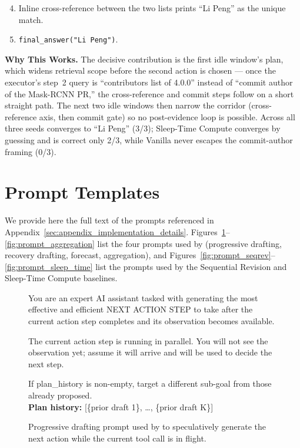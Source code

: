 \begin{tcolorbox}[colback=blue!4, colframe=blue!60!black, title={\textsc{\methodname{}} (Pred: Li Peng / GT: Li Peng; 5 steps)}, fontupper=\small, breakable]
\begin{quote}
\end{quote}
\begin{enumerate}
\setcounter{enumi}{3}
  \item Inline cross-reference between the two lists prints ``Li Peng'' as the unique match.
  \item \texttt{final\_answer("Li Peng")}.
\end{enumerate}
\textbf{Why This Works.} The decisive contribution is the first idle window's plan, which widens retrieval scope before the second action is chosen --- once the executor's step~2 query is ``contributors list of 4.0.0'' instead of ``commit author of the Mask-RCNN PR,'' the cross-reference and commit steps follow on a short straight path. The next two idle windows then narrow the corridor (cross-reference axis, then commit gate) so no post-evidence loop is possible. Across all three seeds \methodname{} converges to ``Li Peng'' (3/3); Sleep-Time Compute converges by guessing and is correct only 2/3, while Vanilla never escapes the commit-author framing (0/3).
\end{tcolorbox}

\clearpage
\section{Prompt Templates}
\label{sec:appendix_prompt_templates}

We provide here the full text of the prompts referenced in Appendix~\ref{sec:appendix_implementation_details}. Figures~\ref{fig:prompt_progressive}--\ref{fig:prompt_aggregation} list the four prompts used by \methodname (progressive drafting, recovery drafting, forecast, aggregation), and Figures~\ref{fig:prompt_seqrev}--\ref{fig:prompt_sleep_time} list the prompts used by the Sequential Revision and Sleep-Time Compute baselines.

\begin{figure}[H]
\begin{tcolorbox}[colback=gray!5, colframe=black!60, title=Progressive drafting prompt, fontupper=\small, width=\linewidth]
You are an expert AI assistant tasked with generating the most effective and efficient NEXT ACTION STEP to take after the current action step completes and its observation becomes available.

The current action step is running in parallel.
You will not see the observation yet; assume it will arrive and will be used to decide the next step.

If plan\_history is non-empty, target a different sub-goal from those already proposed. \\[2pt]
\textbf{Plan history:} [\{prior draft 1\}, \ldots, \{prior draft K\}]
\end{tcolorbox}
\caption{Progressive drafting prompt used by \methodname to speculatively generate the next action while the current tool call is in flight.}
\label{fig:prompt_progressive}
\end{figure}

